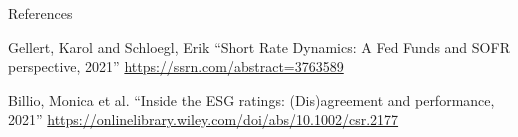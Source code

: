 \documentclass[UKenglish]{beamer}
\begin{document}
\begin{frame}[allowframebreaks]{References}
\begin{thebibliography}{}
        Gellert, Karol and Schloegl, Erik
        \newblock \enquote{Short Rate Dynamics: A Fed Funds and SOFR perspective, 2021}
        \newblock 
        \url{https://ssrn.com/abstract=3763589}

        Billio, Monica et al. 
        \newblock \enquote{Inside the ESG ratings: (Dis)agreement and performance, 2021}
        \newblock \url{https://onlinelibrary.wiley.com/doi/abs/10.1002/csr.2177}
        
        


    \end{thebibliography}
\end{frame}

\end{document}
